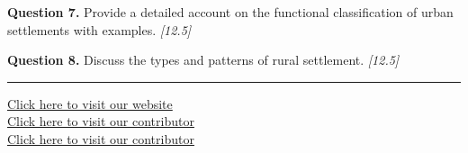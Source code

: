 \documentclass[11pt,a4paper]{article}
\newcommand{\pts}[1]{\hfill   \textit{[#1]}}
\begin{document}
\medskip


\noindent   \textbf{Question 7.} Provide a detailed account on the functional classification of urban settlements with examples. \pts{12.5}

\medskip


\noindent   \textbf{Question 8.} Discuss the types and patterns of rural settlement. \pts{12.5}

\vfill\rule{\linewidth}{0.4pt}

\begin{center}\small
\href{https://bhu-exam.vercel.app/}{Click here to visit our website}\\[4pt]
\href{https://me-aryan.vercel.app/}{Click here to visit our contributor}\\[4pt]
\href{https://quashan-me.vercel.app/}{Click here to visit our contributor}
\end{center}
\end{document}
